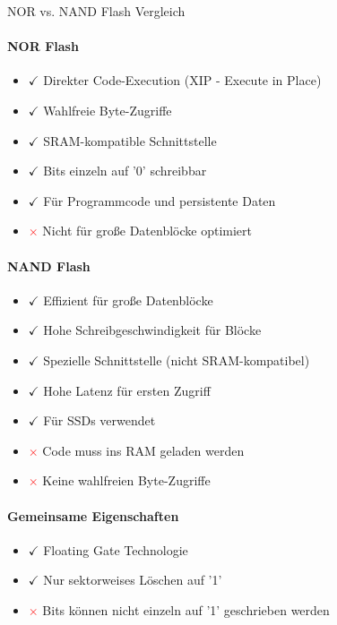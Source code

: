 \begin{concept}{NOR vs. NAND Flash Vergleich}
    \paragraph{NOR Flash}
    \begin{itemize}
        \item \textcolor{frog}{$\checkmark$} Direkter Code-Execution (XIP - Execute in Place)
        \item \textcolor{frog}{$\checkmark$} Wahlfreie Byte-Zugriffe
        \item \textcolor{frog}{$\checkmark$} SRAM-kompatible Schnittstelle
        \item \textcolor{frog}{$\checkmark$} Bits einzeln auf '0' schreibbar
        \item \textcolor{frog}{$\checkmark$} Für Programmcode und persistente Daten
        \item \textcolor{red}{$\times$} Nicht für große Datenblöcke optimiert
    \end{itemize}
    
    \paragraph{NAND Flash}
    \begin{itemize}
        \item \textcolor{frog}{$\checkmark$} Effizient für große Datenblöcke
        \item \textcolor{frog}{$\checkmark$} Hohe Schreibgeschwindigkeit für Blöcke
        \item \textcolor{frog}{$\checkmark$} Spezielle Schnittstelle (nicht SRAM-kompatibel)
        \item \textcolor{frog}{$\checkmark$} Hohe Latenz für ersten Zugriff
        \item \textcolor{frog}{$\checkmark$} Für SSDs verwendet
        \item \textcolor{red}{$\times$} Code muss ins RAM geladen werden
        \item \textcolor{red}{$\times$} Keine wahlfreien Byte-Zugriffe
    \end{itemize}
    
    \paragraph{Gemeinsame Eigenschaften}
    \begin{itemize}
        \item \textcolor{frog}{$\checkmark$} Floating Gate Technologie
        \item \textcolor{frog}{$\checkmark$} Nur sektorweises Löschen auf '1'
        \item \textcolor{red}{$\times$} Bits können nicht einzeln auf '1' geschrieben werden
    \end{itemize}
\end{concept}


